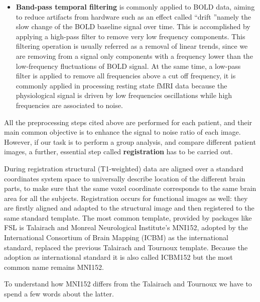 \documentclass[11pt]{report}
\begin{document}
\begin{itemize}
\item \textbf{Band-pass temporal filtering} is commonly applied to BOLD data, aiming to reduce artifacts from hardware such as an effect called \textquotedblleft drift \textquotedblright namely the slow change of the BOLD baseline signal over time. This is accomplished by applying a high-pass filter to remove very low frequency components. This filtering operation is usually referred as a removal of linear trends, since we are removing from a signal only components with a frequency lower than the low-frequency fluctuations of BOLD signal.
At the same time, a low-pass filter is applied to remove all frequencies above a cut off frequency, it is commonly applied in processing resting state fMRI data because the physiological signal is driven by low frequencies oscillations while high frequencies are associated to noise.
\end{itemize}

All the preprocessing steps cited above are performed for each patient, and their main common objective is to enhance the signal to noise ratio of each image. However, if our task is to perform a group analysis, and compare different patient images, a further, essential step called \textbf{registration} has to be carried out.

During registration structural (T1-weighted) data are aligned over a standard coordinates system space to universally describe location of the different brain parts, to make sure that the same voxel coordinate corresponds to the same brain area for all the subjects.
Registration occurs for functional images as well: they are firstly aligned and adapted to the structural image and then registered to the same standard template.
The most common template, provided by packages like FSL is Talairach and Monreal Neurological Institute's MNI152, adopted by the International Consortium of Brain Mapping (ICBM) as the international standard, replaced the previous Talairach and Tournoux template.
Because the adoption as international standard it is also called ICBM152 but the most common name remains MNI152.

To understand how MNI152 differs from the Talairach and Tournoux we have to spend a few words about the latter.\cite{brett2002}
\end{document}
